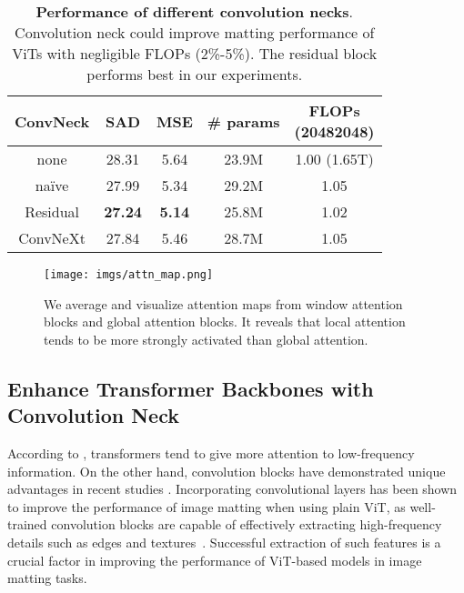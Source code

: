 \documentclass[10pt,twocolumn,letterpaper]{article}
\begin{document}
\begin{table}[tbp]
    \centering
    \renewcommand{\arraystretch}{1.1}
    \begin{tabular}{c|cccc}
    \toprule
        ConvNeck & SAD & MSE & \# params & \makecell[c]{FLOPs \\ (20482048)}\\
    \midrule
    none     & 28.31          & 5.64           & 23.9M   & 1.00 (1.65T) \\
    \midrule
    na\"ive  & 27.99          & 5.34           & 29.2M   & 1.05 \\
    Residual & \textbf{27.24} & \textbf{5.14}  & 25.8M   & 1.02 \\
    ConvNeXt & 27.84          & 5.46           & 28.7M   & 1.05 \\
    \bottomrule
    \end{tabular}
    \caption{\textbf{Performance of different convolution necks}. Convolution neck could improve matting performance of ViTs with negligible FLOPs (2\%-5\%). The residual block performs best in our experiments.}
    \label{convs1}
\end{table}

\begin{figure}[tbp]
    \centering
    \texttt{[image: imgs/attn\_map.png]}
    \caption{We average and visualize attention maps from window attention blocks and global attention blocks. It reveals that local attention tends to be more strongly activated than global attention.}
    \label{fig:attn_map}
\end{figure}





\subsection{Enhance Transformer Backbones with Convolution Neck}

According to \cite{iformer}, transformers tend to give more attention to low-frequency information. On the other hand, convolution blocks have demonstrated unique advantages in recent studies \cite{xiao2021early, dai2021coatnet}. Incorporating convolutional layers has been shown to improve the performance of image matting when using plain ViT, as well-trained convolution blocks are capable of effectively extracting high-frequency details such as edges and textures~\cite{mimdet}. Successful extraction of such features is a crucial factor in improving the performance of ViT-based models in image matting tasks.
\end{document}
